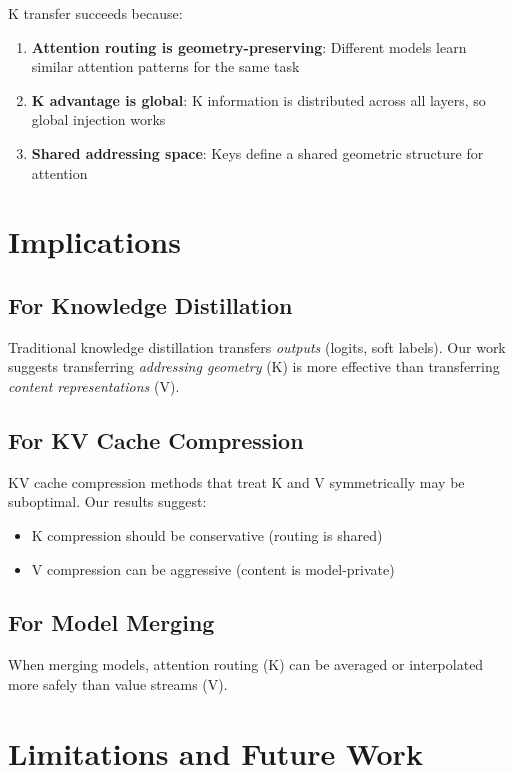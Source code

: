 \documentclass[11pt]{article}
\begin{document}
K transfer succeeds because:

\begin{enumerate}
    \item \textbf{Attention routing is geometry-preserving}: Different models learn similar attention patterns for the same task
    \item \textbf{K advantage is global}: K information is distributed across all layers, so global injection works
    \item \textbf{Shared addressing space}: Keys define a shared geometric structure for attention
\end{enumerate}

\section{Implications}

\subsection{For Knowledge Distillation}

Traditional knowledge distillation transfers \emph{outputs} (logits, soft labels).
Our work suggests transferring \emph{addressing geometry} (K) is more effective than transferring \emph{content representations} (V).

\subsection{For KV Cache Compression}

KV cache compression methods that treat K and V symmetrically may be suboptimal.
Our results suggest:
\begin{itemize}
    \item K compression should be conservative (routing is shared)
    \item V compression can be aggressive (content is model-private)
\end{itemize}

\subsection{For Model Merging}

When merging models, attention routing (K) can be averaged or interpolated more safely than value streams (V).

\section{Limitations and Future Work}
\end{document}
